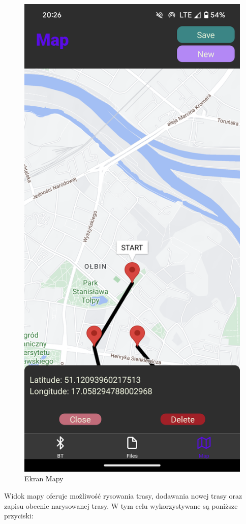 \begin{figure}[H]
    \centering
    \includegraphics[scale = 0.07]{res/Map.png}
    \caption{Ekran Mapy}
\end{figure}
Widok mapy oferuje możliwość rysowania trasy, dodawania nowej trasy oraz zapisu obecnie narysowanej trasy. W tym celu wykorzystywane są poniższe przyciski:

